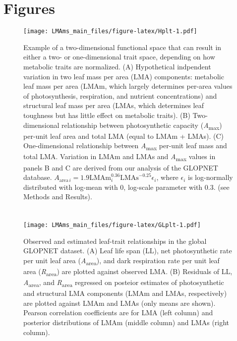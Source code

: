 \documentclass[
  12pt,
]{article}
\begin{document}
\newpage

\hypertarget{figures}{%
\section{Figures}\label{figures}}

\begin{figure}
\centering
\texttt{[image: LMAms\_main\_files/figure-latex/Hplt-1.pdf]}
\caption{\label{fig:Hplt}Example of a two-dimensional functional space that can result in either a two- or one-dimensional trait space, depending on how metabolic traits are normalized. (A) Hypothetical indpendent variation in two leaf mass per area (LMA) components: metabolic leaf mass per area (LMAm, which largely determines per-area values of photosynthesis, respiration, and nutrient concentrations) and structural leaf mass per area (LMAs, which determines leaf toughness but has little effect on metabolic traits). (B) Two-dimensional relationship between photosynthetic capacity (\emph{A}\textsubscript{max}) per-unit leaf area and total LMA (equal to LMAm + LMAs). (C) One-dimensional relationship between \emph{A}\textsubscript{max} per-unit leaf mass and total LMA. Variation in LMAm and LMAs and \emph{A}\textsubscript{max} values in panels B and C are derived from our analysis of the GLOPNET database. \(A_{\mathrm{area} \, i}=1.9\mathrm{LMAm}_i^{0.36}\mathrm{LMAs}^{-0.25}\epsilon_i\), where \(\epsilon_i\) is log-normally distributed with log-mean with 0, log-scale parameter with 0.3. (see Methods and Results).}
\end{figure}

\newpage

\hypertarget{section-2}{%
\section{}\label{section-2}}

\begin{figure}
\centering
\texttt{[image: LMAms\_main\_files/figure-latex/GLplt-1.pdf]}
\caption{\label{fig:GLplt}Observed and estimated leaf-trait relationships in the global GLOPNET dataset. (A) Leaf life span (LL), net photosynthetic rate per unit leaf area (\emph{A}\textsubscript{area}), and dark respiration rate per unit leaf area (\emph{R}\textsubscript{area}) are plotted against observed LMA. (B) Residuals of LL, \emph{A}\textsubscript{area}, and \emph{R}\textsubscript{area} regressed on posteior estimates of photosynthetic and structural LMA components (LMAm and LMAs, respectively) are plotted against LMAm and LMAs (only means are shown). Pearson correlation coefficients are for LMA (left column) and posterior distributions of LMAm (middle column) and LMAs (right column).}
\end{figure}
\end{document}

